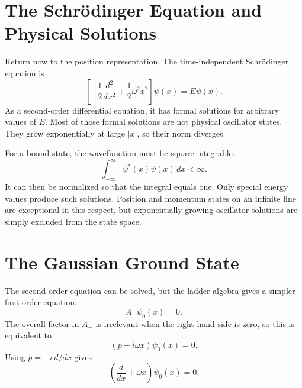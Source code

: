 \begin{classroomqa}
\end{classroomqa}

\section{The Schr\"odinger Equation and Physical Solutions}

Return now to the position representation. The time-independent Schr\"odinger equation is
\begin{equation}
\left[
-\frac12\frac{d^{2}}{dx^{2}}
+\frac12\omega^{2}x^{2}
\right]\psi(x)=E\psi(x).
\end{equation}
As a second-order differential equation, it has formal solutions for arbitrary values of \(E\). Most of those formal solutions are not physical oscillator states. They grow exponentially at large \(\lvert x\rvert\), so their norm diverges.

For a bound state, the wavefunction must be square integrable:
\begin{equation}
\int_{-\infty}^{\infty}\psi^{*}(x)\psi(x)\,dx<\infty.
\end{equation}
It can then be normalized so that the integral equals one. Only special energy values produce such solutions. Position and momentum states on an infinite line are exceptional in this respect, but exponentially growing oscillator solutions are simply excluded from the state space.

\section{The Gaussian Ground State}

The second-order equation can be solved, but the ladder algebra gives a simpler first-order equation:
\begin{equation}
A_{-}\psi_{0}(x)=0.
\end{equation}
The overall factor in \(A_{-}\) is irrelevant when the right-hand side is zero, so this is equivalent to
\begin{equation}
(p-i\omega x)\psi_{0}(x)=0.
\end{equation}
Using \(p=-i\,d/dx\) gives
\begin{equation}
\left(\frac{d}{dx}+\omega x\right)\psi_{0}(x)=0.
\end{equation}

